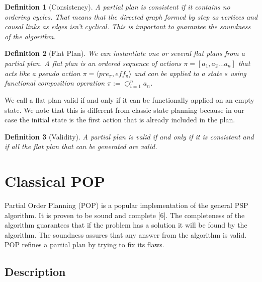 \documentclass[]{article}
\newtheorem{definition}{Definition}
\begin{document}
\begin{definition}[Consistency]

A partial plan is consistent if it contains no ordering cycles. That
means that the directed graph formed by step as vertices and causal
links as edges isn't cyclical. This is important to guarantee the
soundness of the algorithm.

\end{definition}

\begin{definition}[Flat Plan]

We can instantiate one or several flat plans from a partial plan. A flat
plan is an ordered sequence of actions \(\pi = [ a_1, a_2 \ldots a_n]\)
that acts like a pseudo action
\(\pi = \langle pre_\pi, eff_\pi \rangle\) and can be applied to a state
\(s\) using functional composition operation
\(\pi := \bigcirc_{i=1}^n a_n\).

\end{definition}

We call a flat plan valid if and only if it can be functionally applied
on an empty state. We note that this is different from classic state
planning because in our case the initial state is the first action that
is already included in the plan.

\begin{definition}[Validity]

A partial plan is valid if and only if it is consistent and if all the
flat plan that can be generated are valid.

\end{definition}

\section{Classical POP}\label{classical-pop}

Partial Order Planning (POP) is a popular implementation of the general
PSP algorithm. It is proven to be sound and complete {[}6{]}. The
completeness of the algorithm guarantees that if the problem has a
solution it will be found by the algorithm. The soundness assures that
any answer from the algorithm is valid. POP refines a partial plan by
trying to fix its flaws.

\subsection{Description}\label{description}
\end{document}
